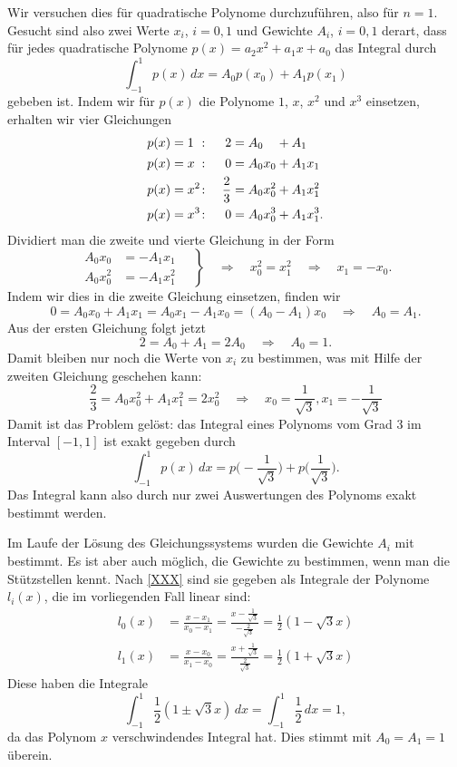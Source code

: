 \begin{beispiel}
Wir versuchen dies für quadratische Polynome durchzuführen, also 
für $n=1$.
Gesucht sind also zwei Werte $x_i$, $i=0,1$ und Gewichte $A_i$, $i=0,1$
derart, dass für jedes quadratische Polynome $p(x)=a_2x^2+a_1x+a_0$ 
das Integral durch
\[
\int_{-1}^1 p(x)\,dx
=
A_0 p(x_0) + A_1 p(x_1)
\]
gebeben ist.
Indem wir für $p(x)$ die Polynome $1$, $x$, $x^2$ und $x^3$ einsetzen,
erhalten wir vier Gleichungen
\[
\begin{aligned}
p(x)&=\rlap{$1$}\phantom{x^2}\colon& 2       &= A_0\phantom{x_0}+ A_1     \\
p(x)&=x^{\phantom{2}}\colon& 0       &= A_0x_0   + A_1x_1  \\
p(x)&=x^2\colon& \frac23 &= A_0x_0^2 + A_1x_1^2\\
p(x)&=x^3\colon& 0       &= A_0x_0^3 + A_1x_1^3.
\end{aligned}
\]
Dividiert man die zweite und vierte Gleichung in der Form
\[
\left.
\begin{aligned}
A_0x_0 &= -A_1x_1\\
A_0x_0^2 &= -A_1x_1^2
\end{aligned}
\quad
\right\}
\quad
\Rightarrow
\quad
x_0^2=x_1^2
\quad
\Rightarrow
\quad
x_1=-x_0.
\]
Indem wir dies in die zweite Gleichung einsetzen, finden wir 
\[
0 = A_0x_0 + A_1x_1 = A_0x_1 -A_1x_0 = (A_0-A_1)x_0
\quad\Rightarrow\quad
A_0=A_1.
\]
Aus der ersten Gleichung folgt jetzt
\[
2= A_0+A_1 = 2A_0 \quad\Rightarrow\quad A_0 = 1.
\]
Damit bleiben nur noch die Werte von $x_i$ zu bestimmen, was 
mit Hilfe der zweiten Gleichung geschehen kann:
\[
\frac23 = A_0x_0^2 + A_1x_1^2 = 2x_0^2
\quad\Rightarrow\quad
x_0 = \frac{1}{\sqrt{3}}, x_1 = -\frac{1}{\sqrt{3}}
\]
Damit ist das Problem gelöst: das Integral eines Polynoms vom Grad 3
im Interval $[-1,1]$ ist exakt gegeben durch
\[
\int_{-1}^1 p(x)\,dx
=
p\biggl(-\frac{1}{\sqrt{3}}\biggr)
+
p\biggl(\frac{1}{\sqrt{3}}\biggr).
\]
Das Integral kann also durch nur zwei Auswertungen des Polynoms
exakt bestimmt werden.

Im Laufe der Lösung des Gleichungssystems wurden die Gewichte $A_i$
mit bestimmt.
Es ist aber auch möglich, die Gewichte zu bestimmen, wenn man die
Stützstellen kennt.
Nach \eqref{XXX} sind sie gegeben als Integrale der Polynome $l_i(x)$,
die im vorliegenden Fall linear sind:
\begin{align*}
l_0(x)
&=
\frac{x-x_1}{x_0-x_1}
=
\frac{x-\frac1{\sqrt{3}}}{-\frac{2}{\sqrt{3}}}
=
\frac12(1-\sqrt{3}x)
\\
l_1(x)
&=
\frac{x-x_0}{x_1-x_0}
=
\frac{x+\frac1{\sqrt{3}}}{\frac{2}{\sqrt{3}}}
=
\frac12(1+\sqrt{3}x)
\end{align*}
Diese haben die Integrale
\[
\int_{-1}^1\frac12(1\pm\sqrt{3}x)\,dx
=
\int_{-1}^1 \frac12\,dx
=
1,
\]
da das Polynom $x$ verschwindendes Integral hat.
Dies stimmt mit $A_0=A_1=1$ überein.
\label{buch:integral:beispiel:gaussquadraturn1}
\end{beispiel}

